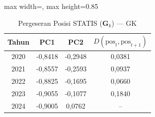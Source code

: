 \begin{table}[H]
\centering
\caption{Pergeseran Posisi STATIS ($\mathbf{G}_k$) --- GK} \label{tab:app2jarak_statis_loading_gk}
\begin{adjustbox}{max width=\textwidth, max height=0.85\textheight}
\begin{tabular}{|c|c|c|c|}
\hline
\textbf{Tahun} & \textbf{PC1} & \textbf{PC2} & \textbf{$D(\text{pos}_t, \text{pos}_{t+1})$} \\
\hline
2020 & -0,8418 & -0,2948 & 0,0381 \\
2021 & -0,8557 & -0,2593 & 0,0937 \\
2022 & -0,8825 & -0,1695 & 0,0660 \\
2023 & -0,9055 & -0,1077 & 0,1840 \\
2024 & -0,9005 & 0,0762 & -- \\
\hline
\end{tabular}
\end{adjustbox}
\end{table}